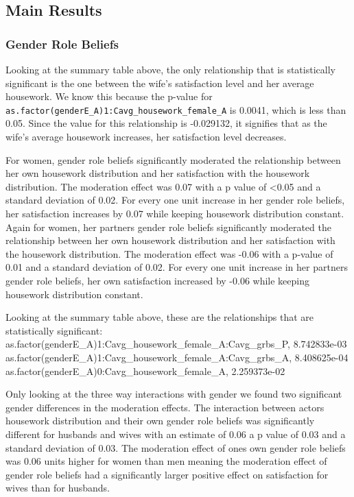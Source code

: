 \documentclass[
  man,floatsintext]{apa6}
\begin{document}
\hypertarget{main-results}{%
\subsection{Main Results}\label{main-results}}

\hypertarget{gender-role-beliefs}{%
\subsubsection{Gender Role Beliefs}\label{gender-role-beliefs}}

Looking at the summary table above, the only relationship that is statistically significant is the one between the wife's satisfaction level and her average housework. We know this because the p-value for \texttt{as.factor(genderE\_A)1:Cavg\_housework\_female\_A} is 0.0041, which is less than 0.05. Since the value for this relationship is -0.029132, it signifies that as the wife's average housework increases, her satisfaction level decreases.

For women, gender role beliefs significantly moderated the relationship between her own housework distribution and her satisfaction with the housework distribution. The moderation effect was 0.07 with a p value of \textless0.05 and a standard deviation of 0.02. For every one unit increase in her gender role beliefs, her satisfaction increases by 0.07 while keeping housework distribution constant. Again for women, her partners gender role beliefs significantly moderated the relationship between her own housework distribution and her satisfaction with the housework distribution. The moderation effect was -0.06 with a p-value of 0.01 and a standard deviation of 0.02. For every one unit increase in her partners gender role beliefs, her own satisfaction increased by -0.06 while keeping housework distribution constant.

Looking at the summary table above, these are the relationships that are statistically significant:
as.factor(genderE\_A)1:Cavg\_housework\_female\_A:Cavg\_grbs\_P, 8.742833e-03
as.factor(genderE\_A)1:Cavg\_housework\_female\_A:Cavg\_grbs\_A, 8.408625e-04
as.factor(genderE\_A)0:Cavg\_housework\_female\_A, 2.259373e-02

Only looking at the three way interactions with gender we found two significant gender differences in the moderation effects. The interaction between actors housework distribution and their own gender role beliefs was significantly different for husbands and wives with an estimate of 0.06 a p value of 0.03 and a standard deviation of 0.03. The moderation effect of ones own gender role beliefs was 0.06 units higher for women than men meaning the moderation effect of gender role beliefs had a significantly larger positive effect on satisfaction for wives than for husbands.
\end{document}
